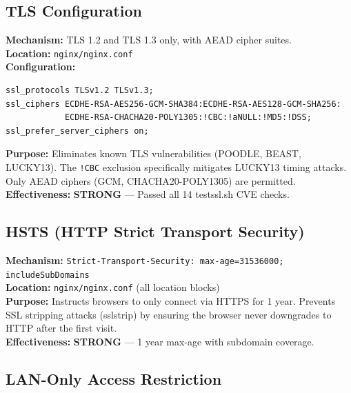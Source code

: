 \documentclass[11pt,a4paper]{article}
\begin{document}
\subsection{TLS Configuration}

\begin{tcolorbox}[colback=shieldgreen!5, colframe=shieldgreen]
\textbf{Mechanism:} TLS 1.2 and TLS 1.3 only, with AEAD cipher suites.\\
\textbf{Location:} \texttt{nginx/nginx.conf}\\
\textbf{Configuration:}
\begin{verbatim}
ssl_protocols TLSv1.2 TLSv1.3;
ssl_ciphers ECDHE-RSA-AES256-GCM-SHA384:ECDHE-RSA-AES128-GCM-SHA256:
            ECDHE-RSA-CHACHA20-POLY1305:!CBC:!aNULL:!MD5:!DSS;
ssl_prefer_server_ciphers on;
\end{verbatim}
\textbf{Purpose:} Eliminates known TLS vulnerabilities (POODLE, BEAST, LUCKY13). The \texttt{!CBC} exclusion specifically mitigates LUCKY13 timing attacks. Only AEAD ciphers (GCM, CHACHA20-POLY1305) are permitted.\\
\textbf{Effectiveness:} \textcolor{shieldgreen}{\textbf{STRONG}} — Passed all 14 testssl.sh CVE checks.
\end{tcolorbox}

\subsection{HSTS (HTTP Strict Transport Security)}

\begin{tcolorbox}[colback=shieldgreen!5, colframe=shieldgreen]
\textbf{Mechanism:} \texttt{Strict-Transport-Security: max-age=31536000; includeSubDomains}\\
\textbf{Location:} \texttt{nginx/nginx.conf} (all location blocks)\\
\textbf{Purpose:} Instructs browsers to only connect via HTTPS for 1 year. Prevents SSL stripping attacks (sslstrip) by ensuring the browser never downgrades to HTTP after the first visit.\\
\textbf{Effectiveness:} \textcolor{shieldgreen}{\textbf{STRONG}} — 1 year max-age with subdomain coverage.
\end{tcolorbox}

\subsection{LAN-Only Access Restriction}
\end{document}
